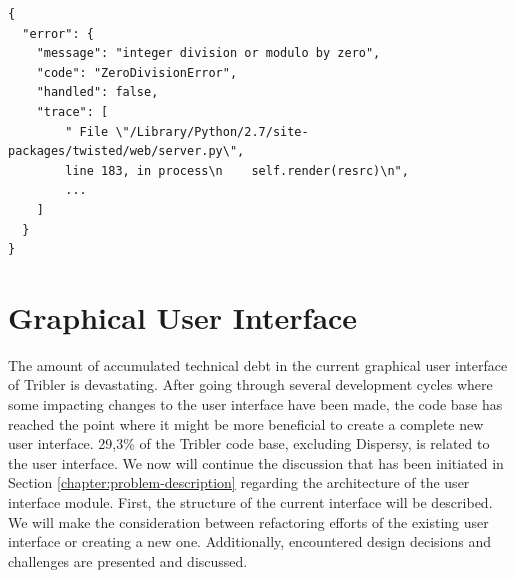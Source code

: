 \begin{lstlisting}[caption={The response in JSON format returned when a Python exception is observed during the processing of an API request.},label={lst:error-api-json}]
{
  "error": {
    "message": "integer division or modulo by zero",
    "code": "ZeroDivisionError",
    "handled": false,
    "trace": [
        " File \"/Library/Python/2.7/site-packages/twisted/web/server.py\", 
        line 183, in process\n    self.render(resrc)\n", 
        ...
    ]
  }
}
\end{lstlisting}

\section{Graphical User Interface}
The amount of accumulated technical debt in the current graphical user interface of Tribler is devastating. After going through several development cycles where some impacting changes to the user interface have been made, the code base has reached the point where it might be more beneficial to create a complete new user interface. 29,3\% of the Tribler code base, excluding Dispersy, is related to the user interface. We now will continue the discussion that has been initiated in Section \ref{chapter:problem-description} regarding the architecture of the user interface module. First, the structure of the current interface will be described. We will make the consideration between refactoring efforts of the existing user interface or creating a new one. Additionally, encountered design decisions and challenges are presented and discussed.

